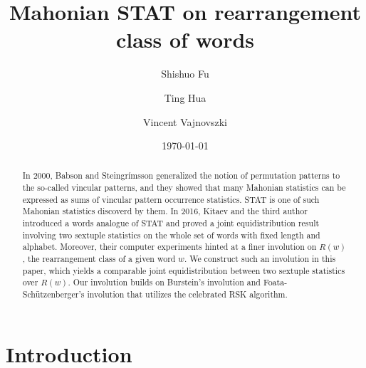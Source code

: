 \documentclass[12pt]{amsart}
\numberwithin{equation}{section}
\theoremstyle{plain}
\theoremstyle{definition}
\begin{document}
\title[STAT on words]{Mahonian STAT on rearrangement class of words}

\author[S.~Fu]{Shishuo Fu}
\address{College of Mathematics and Statistics, Chongqing University, Huxi Campus LD~506, Chongqing 401331, P.R. China.}

\author[T.~Hua]{Ting Hua}
\address{College of Mathematics and Statistics, Chongqing University, Huxi Campus, Chongqing 401331, P.R. China.}

\author[V.~Vajnovszki]{Vincent Vajnovszki}
\address{LE2I, Universit\'{e} de Bourgogne Franche-Comt\'{e}, BP 47870, 21078 Dijon Cedex, France}

\date{\today}


\begin{abstract}
In 2000, Babson and Steingr\'{i}msson generalized the notion of permutation patterns to the so-called vincular patterns, and they showed that many Mahonian statistics can be expressed as sums of vincular pattern occurrence statistics. STAT is one of such Mahonian statistics discoverd by them. In 2016, Kitaev and the third author introduced a words analogue of STAT and proved a joint equidistribution result involving two sextuple statistics on the whole set of words with fixed length and alphabet. Moreover, their computer experiments hinted at a finer involution on $R(w)$,  the rearrangement class of a given word $w$. We construct such an involution in this paper, which yields a comparable joint equidistribution between two sextuple statistics over $R(w)$. Our involution builds on Burstein's involution and Foata-Sch\"{u}tzenberger's involution that utilizes the celebrated RSK algorithm. 

\end{abstract}


\maketitle




\section{Introduction}\label{sec:intro}
\end{document}
